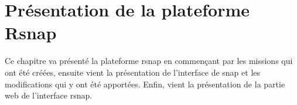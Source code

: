 \chapter{Présentation de la plateforme Rsnap}
Ce chapitre va présenté la plateforme \gls{rsnap} en commençant par les \glspl{mission} qui ont été créées, ensuite vient la présentation de l'interface de \gls{snap} et les modifications qui y ont été apportées. Enfin, vient la présentation de la partie web de l'interface \gls{rsnap}.



